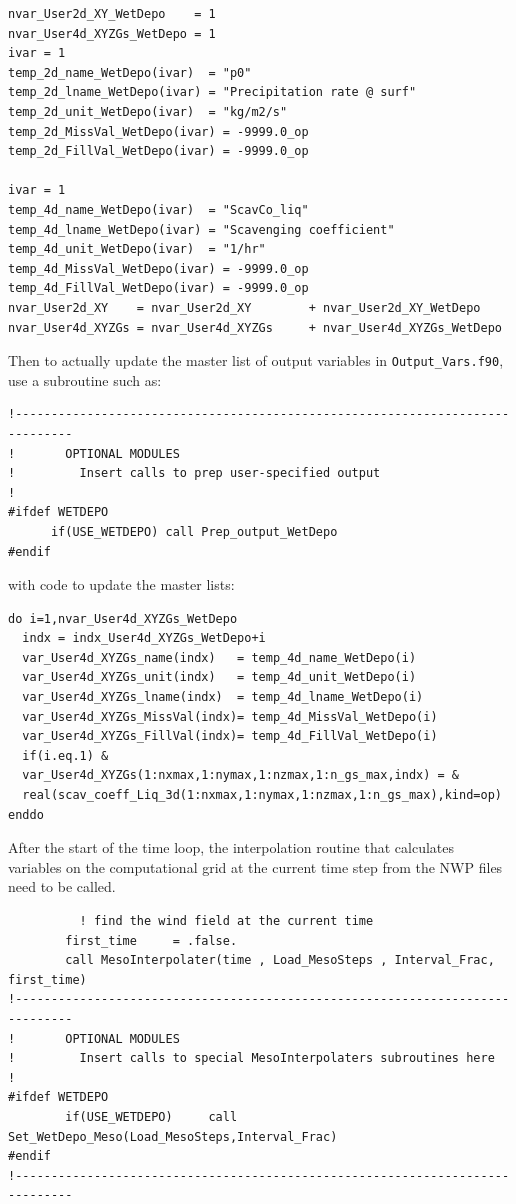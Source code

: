 \small
\begin{verbatim}
nvar_User2d_XY_WetDepo    = 1
nvar_User4d_XYZGs_WetDepo = 1
ivar = 1
temp_2d_name_WetDepo(ivar)  = "p0"
temp_2d_lname_WetDepo(ivar) = "Precipitation rate @ surf"
temp_2d_unit_WetDepo(ivar)  = "kg/m2/s"
temp_2d_MissVal_WetDepo(ivar) = -9999.0_op
temp_2d_FillVal_WetDepo(ivar) = -9999.0_op

ivar = 1
temp_4d_name_WetDepo(ivar)  = "ScavCo_liq"
temp_4d_lname_WetDepo(ivar) = "Scavenging coefficient"
temp_4d_unit_WetDepo(ivar)  = "1/hr"
temp_4d_MissVal_WetDepo(ivar) = -9999.0_op
temp_4d_FillVal_WetDepo(ivar) = -9999.0_op
nvar_User2d_XY    = nvar_User2d_XY        + nvar_User2d_XY_WetDepo
nvar_User4d_XYZGs = nvar_User4d_XYZGs     + nvar_User4d_XYZGs_WetDepo
\end{verbatim}
\normalsize

Then to actually update the master list of output variables in \texttt{Output\_Vars.f90},
use a subroutine such as:
\small
\begin{verbatim}
!------------------------------------------------------------------------------
!       OPTIONAL MODULES
!         Insert calls to prep user-specified output
!
#ifdef WETDEPO
      if(USE_WETDEPO) call Prep_output_WetDepo
#endif
\end{verbatim}
\normalsize
with code to update the master lists:
\small
\begin{verbatim}
do i=1,nvar_User4d_XYZGs_WetDepo
  indx = indx_User4d_XYZGs_WetDepo+i
  var_User4d_XYZGs_name(indx)   = temp_4d_name_WetDepo(i)
  var_User4d_XYZGs_unit(indx)   = temp_4d_unit_WetDepo(i)
  var_User4d_XYZGs_lname(indx)  = temp_4d_lname_WetDepo(i)
  var_User4d_XYZGs_MissVal(indx)= temp_4d_MissVal_WetDepo(i)
  var_User4d_XYZGs_FillVal(indx)= temp_4d_FillVal_WetDepo(i)
  if(i.eq.1) &
  var_User4d_XYZGs(1:nxmax,1:nymax,1:nzmax,1:n_gs_max,indx) = &
  real(scav_coeff_Liq_3d(1:nxmax,1:nymax,1:nzmax,1:n_gs_max),kind=op)
enddo
\end{verbatim}
\normalsize

After the start of the time loop, the interpolation routine that calculates
variables on the computational grid at the current time step from the NWP
files need to be called.
\small
\begin{verbatim}
          ! find the wind field at the current time
        first_time     = .false.
        call MesoInterpolater(time , Load_MesoSteps , Interval_Frac, first_time)
!------------------------------------------------------------------------------
!       OPTIONAL MODULES
!         Insert calls to special MesoInterpolaters subroutines here
!
#ifdef WETDEPO
        if(USE_WETDEPO)     call Set_WetDepo_Meso(Load_MesoSteps,Interval_Frac)
#endif
!------------------------------------------------------------------------------
\end{verbatim}
\normalsize

